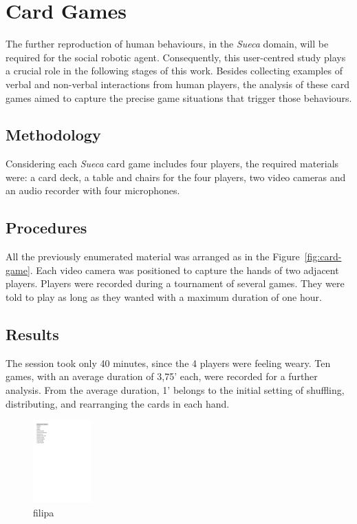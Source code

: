 \section{Card Games}
The further reproduction of human behaviours, in the \emph{Sueca} domain, will be required for the social robotic agent.
Consequently, this user-centred study plays a crucial role in the following stages of this work.
Besides collecting examples of verbal and non-verbal interactions from human players, the analysis of these card games aimed to capture the precise game situations that trigger those behaviours.



\subsection{Methodology}
Considering each \emph{Sueca} card game includes four players, the required materials were: a card deck, a table and chairs for the four players, two video cameras and an audio recorder with four microphones.

\subsection{Procedures}
All the previously enumerated material was arranged as in the Figure~\ref{fig:card-game}.
Each video camera was positioned to capture the hands of two adjacent players.
Players were recorded during a tournament of several games.
They were told to play as long as they wanted with a maximum duration of one hour.

\subsection{Results}
The session took only 40 minutes, since the 4 players were feeling weary.
Ten games, with an average duration of 3,75' each, were recorded for a further analysis.
From the average duration, 1' belongs to the initial setting of shuffling, distributing, and rearranging the cards in each hand.

\begin{figure}[h]
  \centering
    \includegraphics[width=0.2\textwidth]{./img/5/gameSituations}
  \caption{filipa}
\label{fig:gameSituations}
\end{figure}

